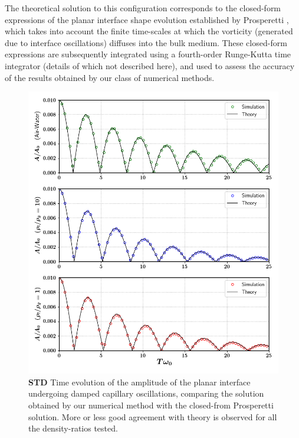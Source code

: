 The theoretical solution to this configuration corresponds to the closed-form expressions of the planar interface shape evolution established by Prosperetti \cite{prosperetti1981motion,prosperetti1980free}, which takes into account the finite time-scales at which the vorticity (generated due to interface oscillations) diffuses into the bulk medium. These closed-form expressions are subsequently integrated using a fourth-order Runge-Kutta time integrator (details of which not described here), and used to assess the accuracy of the results obtained by our class of numerical methods. 


\begin{figure}[h!]
    \centering
    \includegraphics[width = 1.0\textwidth]{plots/capwave/compare_nonmc.png}
	\caption{\textbf{STD} Time evolution of the amplitude of the planar interface undergoing damped capillary oscillations, comparing the solution obtained by our numerical method with the closed-from Prosperetti solution. More or less good agreement with theory is observed for all the density-ratios tested. }
    \label{capwave_nonmc}
\end{figure}

